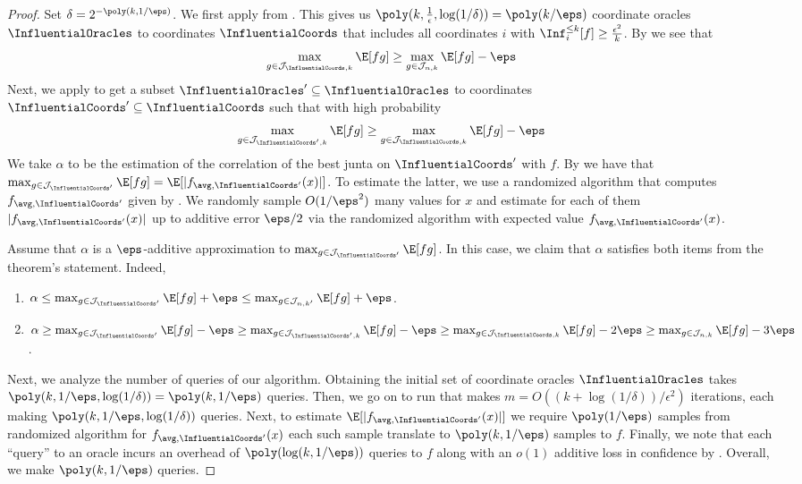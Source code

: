 \begin{proof}
Set $\delta = 2^{-\poly(k, 1/\eps)}$.
We first apply  from \cite{junta-coordinate-oracles}. This gives us $\poly(k, \frac{1}{\epsilon}, \log(1/\delta)) = \poly(k/\eps)$ coordinate oracles $\InfluentialOracles$ to coordinates $\InfluentialCoords$ that includes all coordinates $i$ with $\Inf_i^{\leq k}[f] \geq \frac{\epsilon^2}{k}$.
By  we see that $$\max_{g \in \mathcal{J}_{\InfluentialCoords,k}} \E[fg]\ge \max_{g \in \mathcal{J}_{n,k}}\E[fg] - \eps$$
Next, we apply  to get a subset $\InfluentialOracles' \subseteq \InfluentialOracles$ to coordinates $\InfluentialCoords' \subseteq \InfluentialCoords$ such that with high probability
 $$\max_{g \in \mathcal{J}_{\InfluentialCoords',k}} \E[fg]\ge \max_{g \in \mathcal{J}_{\InfluentialCoords,k}}\E[fg] - \eps$$
We take $\alpha$ to be the estimation of  the correlation of the best junta on $\InfluentialCoords'$ with $f$.
By  we have that $\max_{g \in \mathcal{J}_{\InfluentialCoords'}}\E[fg] = \E[|f_{\avg, \InfluentialCoords'}(x)|]$.
To estimate the latter, we use a randomized algorithm that computes $f_{\avg, \InfluentialCoords'}$ given by .
We randomly sample $O(1/\eps^2)$ many values for $x$ and estimate for each of them $|f_{\avg, \InfluentialCoords'}(x)|$ up to additive error $\eps/2$ via the randomized algorithm with expected value $f_{\avg, \InfluentialCoords'}(x)$.

Assume that $\alpha$ is a $\eps$-additive approximation to $\max_{g \in \mathcal{J}_{\InfluentialCoords'}} \E[fg]$.
In this case, we claim that $\alpha$ satisfies both items from the theorem's statement.
Indeed, 
\begin{enumerate}
	\item $\alpha \le \max_{g \in \mathcal{J}_{\InfluentialCoords'}} \E[fg] + \eps \le \max_{g \in \mathcal{J}_{n,k'}} \E[fg] + \eps$.
	\item $\alpha \ge \max_{g \in \mathcal{J}_{\InfluentialCoords'}} \E[fg] - \eps \ge \max_{g \in \mathcal{J}_{\InfluentialCoords',k}} \E[fg] -\eps \ge  \max_{g \in \mathcal{J}_{\InfluentialCoords,k}}\E[fg] - 2\eps
	\ge \max_{g \in \mathcal{J}_{n,k}}\E[fg] - 3\eps$.
\end{enumerate}

Next, we analyze the number of queries of our algorithm.
Obtaining the initial set of coordinate oracles $\InfluentialOracles$ takes $\poly(k, 1/\eps, \log(1/\delta)) = \poly(k,1/\eps)$ queries.
Then, we go on to run  that makes $m = O((k+ \log(1/\delta))/\epsilon^2)$ iterations, each making $\poly(k, 1/\eps,\log(1/\delta))$ queries.
Next, to estimate $\E[|f_{\avg, \InfluentialCoords'}(x)|]$ we require $\poly(1/\eps)$ samples from randomized algorithm for $f_{\avg, \InfluentialCoords'}(x)$ each such sample translate to $\poly(k, 1/\eps)$ samples to $f$. Finally, we note that each ``query'' to an oracle incurs an overhead of $\poly(\log(k,1/\eps))$ queries to $f$ along with an $o(1)$ additive loss in confidence by .
Overall, we make $\poly(k, 1/\eps)$ queries.
\end{proof}

